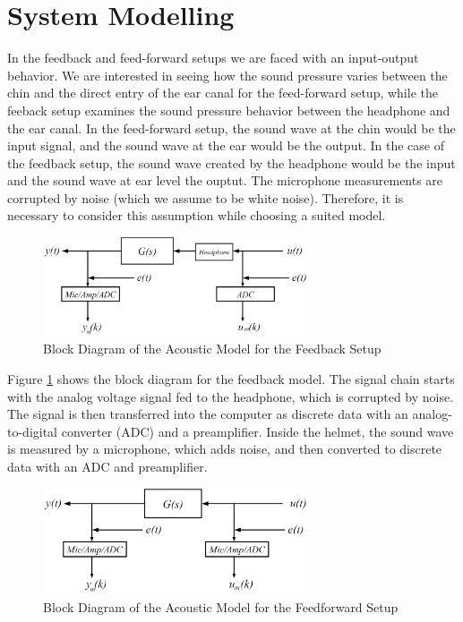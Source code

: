\section{System Modelling}\label{sec: sysmod}

In the feedback and feed-forward setups we are faced with an input-output behavior. We are interested in seeing how the sound pressure varies between the chin and the direct entry of the ear canal for the feed-forward setup, while the feeback setup examines the sound pressure behavior between the headphone and the ear canal. In the feed-forward setup, the sound wave at the chin would be the input signal, and the sound wave at the ear would be the output. In the case of the feedback setup, the sound wave created by the headphone would be the input and the sound wave at ear level the ouptut. The microphone measurements are corrupted by noise (which we assume to be white noise). Therefore, it is necessary to consider this assumption while choosing a suited model.\\

\begin{figure}[h]
\centering
\includegraphics[width=0.7\textwidth]{pics/modelfb}
\caption{Block Diagram of the Acoustic Model for the Feedback Setup}
\label{fig:modelfb}
\end{figure}

Figure \ref{fig:modelfb} shows the block diagram for the feedback model. The signal chain starts with the analog voltage signal fed to the headphone, which is corrupted by noise. The signal is then transferred into the computer as discrete data with an analog-to-digital converter (ADC) and a preamplifier. Inside the helmet, the sound wave is measured by a microphone, which adds noise, and then converted to discrete data with an ADC and preamplifier. \\

\begin{figure}[h]
\centering
\includegraphics[width=0.7\textwidth]{pics/modelff}
\caption{Block Diagram of the Acoustic Model for the Feedforward Setup}
\label{fig:modelff}
\end{figure}

